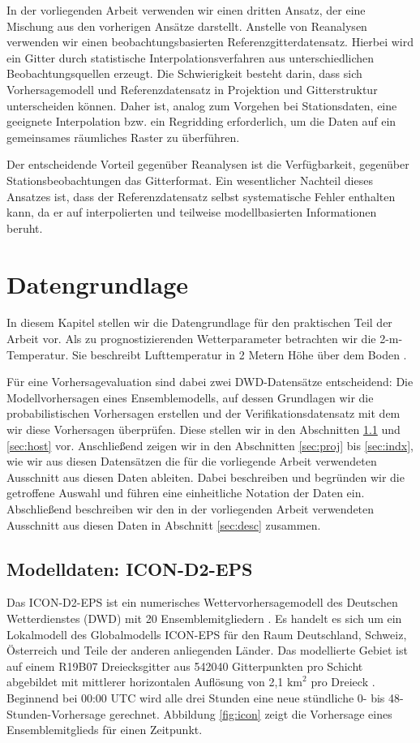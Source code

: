 In der vorliegenden Arbeit verwenden wir einen dritten Ansatz, der eine Mischung aus den vorherigen Ansätze darstellt. Anstelle von Reanalysen verwenden wir einen beobachtungsbasierten Referenzgitterdatensatz. Hierbei wird ein Gitter durch statistische Interpolationsverfahren aus unterschiedlichen Beobachtungsquellen erzeugt. Die Schwierigkeit besteht darin, dass sich Vorhersagemodell und Referenzdatensatz in Projektion und Gitterstruktur unterscheiden können. Daher ist, analog zum Vorgehen bei Stationsdaten, eine geeignete Interpolation bzw. ein Regridding erforderlich, um die Daten auf ein gemeinsames räumliches Raster zu überführen.

Der entscheidende Vorteil gegenüber Reanalysen ist die Verfügbarkeit, gegenüber Stationsbeobachtungen das Gitterformat. Ein wesentlicher Nachteil dieses Ansatzes ist, dass der Referenzdatensatz selbst systematische Fehler enthalten kann, da er auf interpolierten und teilweise modellbasierten Informationen beruht. 
\newpage


\chapter{Datengrundlage} \label{chap:data}
In diesem Kapitel stellen wir die Datengrundlage für den praktischen Teil der Arbeit vor. Als zu prognostizierenden Wetterparameter betrachten wir die 2-m-Temperatur. Sie beschreibt Lufttemperatur in 2 Metern Höhe über dem Boden \parencite{dwd_2m_temperatur}.

Für eine Vorhersagevaluation sind dabei zwei DWD-Datensätze entscheidend: Die Modellvorhersagen eines Ensemblemodells, auf dessen Grundlagen wir die probabilistischen Vorhersagen erstellen und der Verifikationsdatensatz mit dem wir diese Vorhersagen überprüfen. Diese stellen wir in den Abschnitten \ref{sec:icon} und \ref{sec:host} vor. Anschließend zeigen wir in den Abschnitten \ref{sec:proj} bis \ref{sec:indx}, wie wir aus diesen Datensätzen die für die vorliegende Arbeit verwendeten Ausschnitt aus diesen Daten ableiten. Dabei beschreiben und begründen wir die getroffene Auswahl und führen eine einheitliche Notation der Daten ein. Abschließend beschreiben wir den in der vorliegenden Arbeit verwendeten Ausschnitt aus diesen Daten in Abschnitt \ref{sec:desc} zusammen.

\section{Modelldaten: ICON-D2-EPS} \label{sec:icon}
Das ICON-D2-EPS ist ein numerisches Wettervorhersagemodell des Deutschen Wetterdienstes (DWD) mit 20 Ensemblemitgliedern \parencite{reinert2025icon_dwd}. Es handelt es sich um ein Lokalmodell des Globalmodells ICON-EPS für den Raum Deutschland, Schweiz, Österreich und Teile der anderen anliegenden Länder. Das modellierte Gebiet ist auf einem R19B07 Dreiecksgitter aus 542040 Gitterpunkten pro Schicht abgebildet mit mittlerer horizontalen Auflösung von 2,1 $\mathrm{km}^2$ pro Dreieck \parencite{reinert2025icon_dwd}. Beginnend bei 00:00 UTC wird alle drei Stunden eine neue stündliche 0- bis 48-Stunden-Vorhersage gerechnet. Abbildung \ref{fig:icon} zeigt die Vorhersage eines Ensemblemitglieds für einen Zeitpunkt.

